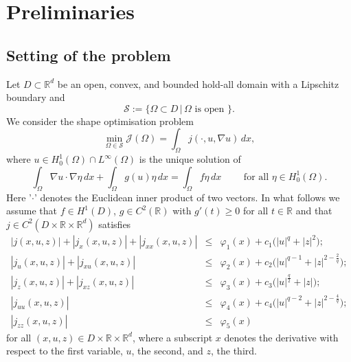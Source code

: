 \documentclass[a4paper,10pt]{article}
\newcommand{\dx}{\,dx}
\theoremstyle{plain}
\theoremstyle{plain}
\numberwithin{equation}{section}
\begin{document}
\section{Preliminaries}\label{sec:Preliminaries}
\subsection{Setting of the problem}

\noindent
Let $D \subset \mathbb R^d$ be an open, convex, and bounded hold-all domain with a Lipschitz boundary and 
\begin{displaymath}
\mathcal S:= \lbrace \Omega \subset D \, | \, \Omega \mbox{ is open } \rbrace.
\end{displaymath}
\noindent
We consider the shape optimisation problem
\begin{displaymath}
\min_{\Omega \in \mathcal S} \mathcal J(\Omega) = \int_{\Omega} j(\cdot,u,\nabla u)  \dx,
\end{displaymath}
where $u \in H^1_0(\Omega)\cap L^\infty(\Omega)$ is the unique solution of 
\begin{equation} \label{state}
\int_{\Omega} \nabla u \cdot \nabla \eta  \dx + \int_{\Omega} g(u) \eta \dx  = \int_{\Omega }f \eta \dx  \qquad \mbox{ for all } \eta \in H^1_0(\Omega).
\end{equation}
Here  '$\cdot$' denotes the Euclidean inner product of two vectors. 
In what follows we assume that $f \in H^1(D)$, $g \in C^2(\mathbb{R})$ with $g'(t) \ge 0$ for all $t \in \mathbb R$ and that $j \in C^2(D \times \mathbb R \times \mathbb R^d)$ satisfies 
\begin{eqnarray}
| j(x,u,z) | + | j_x(x,u,z)| + | j_{xx}(x,u,z)|  & \leq  & \varphi_1(x)+ c_1 \bigl( | u|^q + |z|^2 \bigr); \label{jest} \\
| j_u(x,u,z) | + | j_{xu}(x,u,z) | & \leq  &  \varphi_2(x) + c_2 \bigl(  |u |^{q-1} + | z|^{2-\frac{2}{q}} \bigr);   \label{j1est} \\
| j_z(x,u,z) | + | j_{xz}(x,u,z) |  & \leq   & \varphi_3(x) + c_3 \bigl( |u|^{\frac{q}{2}} + |z| \bigr);  \label{j2est}   \\
| j_{uu}(x,u,z) | & \leq  &\varphi_4(x) + c_4 \bigl( |u|^{q-2} + |z|^{2- \frac{4}{q}} \bigr); \label{j3est} \\
  | j_{zz}(x,u,z) | & \leq & \varphi_5(x) \label{j4est}
\end{eqnarray}
for all $(x,u,z) \in  D \times  \mathbb R \times \mathbb R^d$, {where a subscript $x$ denotes the derivative with respect to the first variable, $u$, the second, and $z$, the third}.
\end{document}
